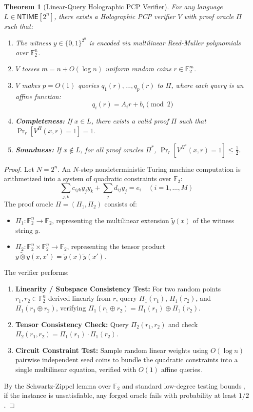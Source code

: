 \documentclass[11pt,letterpaper]{article}
\newtheorem{theorem}{Theorem}[section]
\newcommand{\NTIME}{\mathsf{NTIME}}
\newcommand{\F}{\mathbb{F}}
\begin{document}
\begin{theorem}[Linear-Query Holographic PCP Verifier]
\label{thm:holographic_pcp}
For any language $L \in \NTIME[2^n]$, there exists a Holographic PCP verifier $V$ with proof oracle $\Pi$ such that:
\begin{enumerate}
    \item The witness $y \in \{0,1\}^{2^n}$ is encoded via multilinear Reed-Muller polynomials over $\F_2^n$.
    \item $V$ tosses $m = n + O(\log n)$ uniform random coins $r \in \F_2^m$.
    \item $V$ makes $p = O(1)$ queries $q_1(r), \dots, q_p(r)$ to $\Pi$, where each query is an affine function:
    \[
    q_i(r) = A_i r + b_i \pmod 2
    \]
    \item \textbf{Completeness:} If $x \in L$, there exists a valid proof $\Pi$ such that $\Pr_r[V^\Pi(x, r) = 1] = 1$.
    \item \textbf{Soundness:} If $x \notin L$, for all proof oracles $\Pi^*$, $\Pr_r[V^{\Pi^*}(x, r) = 1] \le \frac{1}{2}$.
\end{enumerate}
\end{theorem}

\begin{proof}
Let $N = 2^n$. An $N$-step nondeterministic Turing machine computation is arithmetized into a system of quadratic constraints over $\F_2$:
\[
\sum_{j,k} c_{ijk} y_j y_k + \sum_j d_{ij} y_j = e_i \quad (i = 1, \dots, M)
\]
The proof oracle $\Pi = (\Pi_1, \Pi_2)$ consists of:
\begin{itemize}
    \item $\Pi_1: \F_2^n \to \F_2$, representing the multilinear extension $\tilde{y}(x)$ of the witness string $y$.
    \item $\Pi_2: \F_2^n \times \F_2^n \to \F_2$, representing the tensor product $\widetilde{y \otimes y}(x, x') = \tilde{y}(x) \tilde{y}(x')$.
\end{itemize}
The verifier performs:
\begin{enumerate}
    \item \textbf{Linearity / Subspace Consistency Test:} For two random points $r_1, r_2 \in \F_2^n$ derived linearly from $r$, query $\Pi_1(r_1)$, $\Pi_1(r_2)$, and $\Pi_1(r_1 \oplus r_2)$, verifying $\Pi_1(r_1 \oplus r_2) = \Pi_1(r_1) \oplus \Pi_1(r_2)$.
    \item \textbf{Tensor Consistency Check:} Query $\Pi_2(r_1, r_2)$ and check $\Pi_2(r_1, r_2) = \Pi_1(r_1) \cdot \Pi_1(r_2)$.
    \item \textbf{Circuit Constraint Test:} Sample random linear weights using $O(\log n)$ pairwise independent seed coins to bundle the quadratic constraints into a single multilinear equation, verified with $O(1)$ affine queries.
\end{enumerate}
By the Schwartz-Zippel lemma over $\F_2$ and standard low-degree testing bounds \cite{ALMSS98}, if the instance is unsatisfiable, any forged oracle fails with probability at least $1/2$.
\end{proof}
\end{document}
